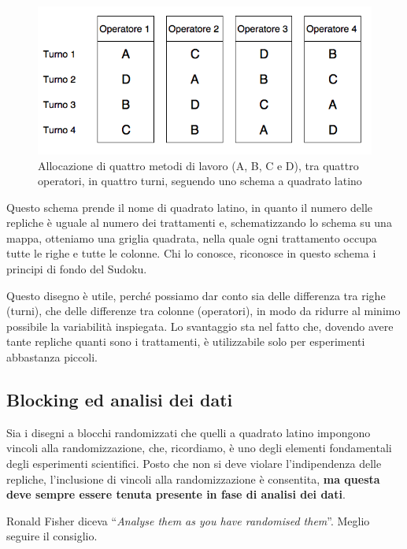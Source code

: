\documentclass[a4paper,12pt,oneside]{book}
\begin{document}
\begin{figure}

{\centering \includegraphics[width=0.9\linewidth]{_images/TurniOperatori} 

}

\caption{Allocazione di quattro metodi di lavoro (A, B, C e D), tra quattro operatori, in quattro turni, seguendo uno schema a quadrato latino}\label{fig:figName391}
\end{figure}

Questo schema prende il nome di quadrato latino, in quanto il numero delle repliche è uguale al numero dei trattamenti e, schematizzando lo schema su una mappa, otteniamo una griglia quadrata, nella quale ogni trattamento occupa tutte le righe e tutte le colonne. Chi lo conosce, riconosce in questo schema i principi di fondo del Sudoku.

Questo disegno è utile, perché possiamo dar conto sia delle differenza tra righe (turni), che delle differenze tra colonne (operatori), in modo da ridurre al minimo possibile la variabilità inspiegata. Lo svantaggio sta nel fatto che, dovendo avere tante repliche quanti sono i trattamenti, è utilizzabile solo per esperimenti abbastanza piccoli.

\hypertarget{blocking-ed-analisi-dei-dati}{%
\subsection{Blocking ed analisi dei dati}\label{blocking-ed-analisi-dei-dati}}

Sia i disegni a blocchi randomizzati che quelli a quadrato latino impongono vincoli alla randomizzazione, che, ricordiamo, è uno degli elementi fondamentali degli esperimenti scientifici. Posto che non si deve violare l'indipendenza delle repliche, l'inclusione di vincoli alla randomizzazione è consentita, \textbf{ma questa deve sempre essere tenuta presente in fase di analisi dei dati}.

Ronald Fisher diceva ``\emph{Analyse them as you have randomised them}''. Meglio seguire il consiglio.
\end{document}
